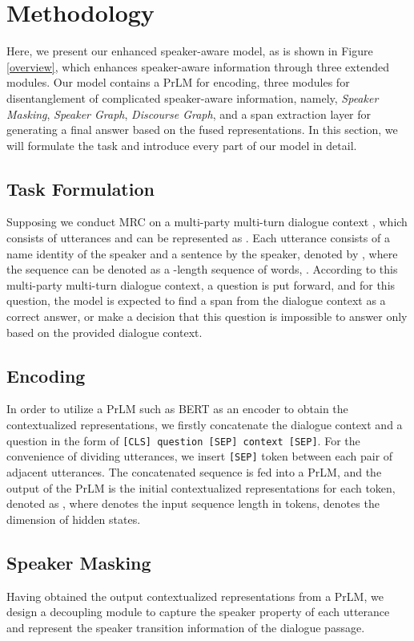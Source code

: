 \documentclass[letterpaper]{article} \usepackage{stylefile}  \usepackage{times}  \usepackage{helvet}  \usepackage{courier}  \usepackage[hyphens]{url}  \usepackage{graphicx} \urlstyle{rm} \def\UrlFont{\rm}  \usepackage{natbib}  \usepackage{caption} \DeclareCaptionStyle{ruled}{labelfont=normalfont,labelsep=colon,strut=off} \frenchspacing  \setlength{\pdfpagewidth}{8.5in}  \setlength{\pdfpageheight}{11in}  \usepackage{algorithm}
\begin{document}
\section{Methodology}

Here, we present our enhanced speaker-aware model, as is shown in Figure \ref{overview}, which enhances speaker-aware information through three extended modules. Our model contains a PrLM for encoding, three modules for disentanglement of complicated speaker-aware information, namely, \emph{Speaker Masking}, \emph{Speaker Graph}, \emph{Discourse Graph}, and a span extraction layer for generating a final answer based on the fused representations. In this section, we will formulate the task and introduce every part of our model in detail.


\subsection{Task Formulation}
Supposing we conduct MRC on a multi-party multi-turn dialogue context , which consists of  utterances and can be represented as . Each utterance  consists of a name identity of the speaker and a sentence by the speaker, denoted by , where the sequence  can be denoted as a -length sequence of words, . According to this multi-party multi-turn dialogue context, a question  is put forward, and for this question, the model is expected to find a span from the dialogue context as a correct answer, or make a decision that this question is impossible to answer only based on the provided dialogue context.
\subsection{Encoding}
In order to utilize a PrLM such as BERT as an encoder to obtain the contextualized representations, we firstly concatenate the dialogue context and a question in the form of \texttt{[CLS] question [SEP] context [SEP]}. For the convenience of dividing utterances, we insert \texttt{[SEP]} token between each pair of adjacent utterances. The concatenated sequence is fed into a PrLM, and the output of the PrLM is the initial contextualized representations for each token, denoted as , where  denotes the input sequence length in tokens,  denotes the dimension of hidden states.






\subsection{Speaker Masking}
Having obtained the output contextualized representations from a PrLM, we design a decoupling module to capture the speaker property of each utterance and represent the speaker transition information of the dialogue passage.
\end{document}
